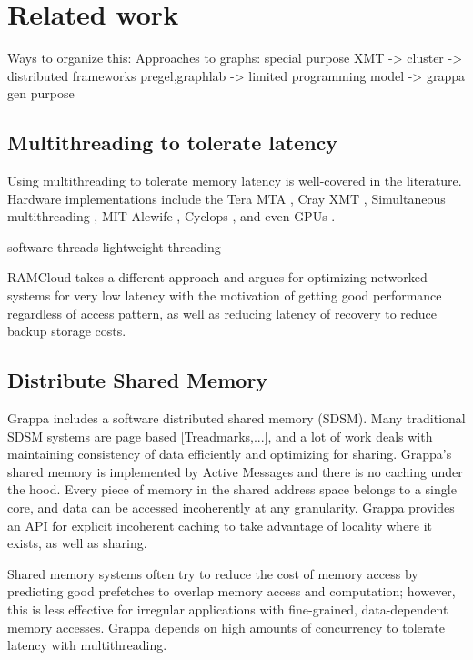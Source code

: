 \section{Related work}

Ways to organize this:
Approaches to graphs: special purpose XMT -> cluster -> distributed frameworks {pregel,graphlab} -> limited programming model -> grappa gen purpose



\subsection{Multithreading to tolerate latency}
Using multithreading to tolerate memory latency is well-covered in the literature. Hardware implementations include the Tera MTA \cite{Tera}, Cray XMT \cite{}, Simultaneous multithreading \cite{}, MIT Alewife \cite{}, Cyclops \cite{}, and even GPUs \cite{fatahalian}.

software threads
lightweight threading

RAMCloud takes a different approach and argues for optimizing networked systems for very low latency with the motivation of getting good performance regardless of access pattern, as well as reducing latency of recovery to reduce backup storage costs.


\subsection{Distribute Shared Memory}

Grappa includes a software distributed shared memory (SDSM). Many traditional SDSM systems are page based [Treadmarks,...], and a lot of work deals with maintaining consistency of data efficiently and optimizing for sharing. Grappa's shared memory is implemented by Active Messages and there is no caching under the hood. Every piece of memory in the shared address space belongs to a single core, and data can be accessed incoherently at any granularity. Grappa provides an API for explicit incoherent caching to take advantage of locality where it exists, as well as sharing. 

Shared memory systems often try to reduce the cost of memory access by predicting good prefetches to overlap memory access and computation; however, this is less effective for irregular applications with fine-grained, data-dependent memory accesses. Grappa depends on high amounts of concurrency to tolerate latency with multithreading.

